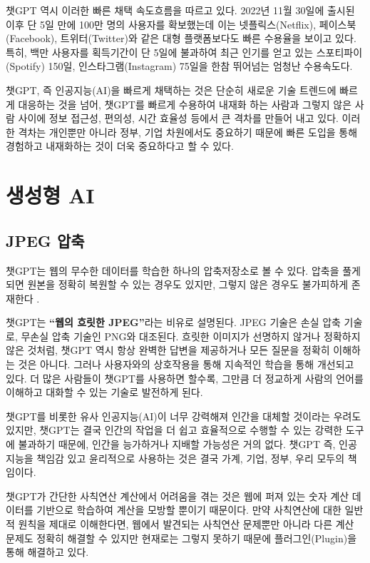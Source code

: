 \documentclass[
  letterpaper,
]{book}
\begin{document}
챗GPT 역시 이러한 빠른 채택 속도흐름을 따르고 있다. 2022년 11월 30일에
출시된 이후 단 5일 만에 100만 명의 사용자를 확보했는데 이는
넷플릭스(Netflix), 페이스북(Facebook), 트위터(Twitter)와 같은 대형
플랫폼보다도 빠른 수용율을 보이고 있다. 특히, 백만 사용자를 획득기간이
단 5일에 불과하여 최근 인기를 얻고 있는 스포티파이(Spotify) 150일,
인스타그램(Instagram) 75일을 한참 뛰어넘는 엄청난 수용속도다.

챗GPT, 즉 인공지능(AI)을 빠르게 채택하는 것은 단순히 새로운 기술
트렌드에 빠르게 대응하는 것을 넘어, 챗GPT를 빠르게 수용하여 내재화 하는
사람과 그렇지 않은 사람 사이에 정보 접근성, 편의성, 시간 효율성 등에서
큰 격차를 만들어 내고 있다. 이러한 격차는 개인뿐만 아니라 정부, 기업
차원에서도 중요하기 때문에 빠른 도입을 통해 경험하고 내재화하는 것이
더욱 중요하다고 할 수 있다.

\hypertarget{uxc0dduxc131uxd615-ai}{%
\section{생성형 AI}\label{uxc0dduxc131uxd615-ai}}

\hypertarget{jpeg-uxc555uxcd95}{%
\subsection{JPEG 압축}\label{jpeg-uxc555uxcd95}}

챗GPT는 웹의 무수한 데이터를 학습한 하나의 압축저장소로 볼 수 있다.
압축을 풀게되면 원본을 정확히 복원할 수 있는 경우도 있지만, 그렇지 않은
경우도 불가피하게 존재한다\autocite{Chiang2023} .

챗GPT는 \textbf{``웹의 흐릿한 JPEG''}라는 비유로 설명된다. JPEG 기술은
손실 압축 기술로, 무손실 압축 기술인 PNG와 대조된다. 흐릿한 이미지가
선명하지 않거나 정확하지 않은 것처럼, 챗GPT 역시 항상 완벽한 답변을
제공하거나 모든 질문을 정확히 이해하는 것은 아니다. 그러나 사용자와의
상호작용을 통해 지속적인 학습을 통해 개선되고 있다. 더 많은 사람들이
챗GPT를 사용하면 할수록, 그만큼 더 정교하게 사람의 언어를 이해하고
대화할 수 있는 기술로 발전하게 된다.

챗GPT를 비롯한 유사 인공지능(AI)이 너무 강력해져 인간을 대체할 것이라는
우려도 있지만, 챗GPT는 결국 인간의 작업을 더 쉽고 효율적으로 수행할 수
있는 강력한 도구에 불과하기 때문에, 인간을 능가하거나 지배할 가능성은
거의 없다. 챗GPT 즉, 인공지능을 책임감 있고 윤리적으로 사용하는 것은
결국 가계, 기업, 정부, 우리 모두의 책임이다.

챗GPT가 간단한 사칙연산 계산에서 어려움을 겪는 것은 웹에 퍼져 있는 숫자
계산 데이터를 기반으로 학습하여 계산을 모방할 뿐이기 때문이다. 만약
사칙연산에 대한 일반적 원칙을 제대로 이해한다면, 웹에서 발견되는
사칙연산 문제뿐만 아니라 다른 계산 문제도 정확히 해결할 수 있지만
현재로는 그렇지 못하기 때문에 플러그인(Plugin)을 통해 해결하고 있다.
\end{document}

